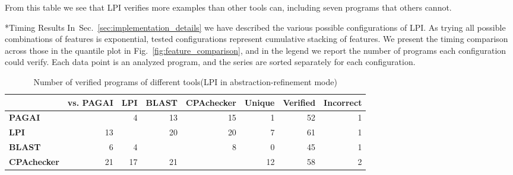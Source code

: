 \documentclass{llncs}
\makeatletter
\renewcommand{\paragraph}{\@startsection{paragraph}{4}{\z@}{0.8ex \@plus 0ex \@minus 1ex}{-1em}{\normalfont\normalsize\bfseries}}
\makeatother
\begin{document}
From this table we see that LPI verifies more examples than other tools can, including seven programs that others cannot.

\paragraph*{Timing Results}
In~Sec.~\ref{sec:implementation_details} we have described the various possible configurations of LPI.
As trying all possible combinations of features is exponential,
tested configurations represent cumulative stacking of features.
We present the timing comparison across those in the quantile plot in
Fig.~\ref{fig:feature_comparison}, and in the legend we report the number of programs each
configuration could verify.
Each data point is an analyzed
program, and the series are sorted separately for each configuration.

\begin{table}[t]
    \centering
    
\begin{tabular}{l|rrrr|rrr}
   & vs. PAGAI & LPI & BLAST & CPAchecker & Unique & \textbf{Verified} &
   \textbf{Incorrect} \\
\midrule
\textbf{PAGAI} & \cellcolor{LightGray}  & 4 & 13 & 15 & 1 & 52 & 1\\
\textbf{LPI} & 13 & \cellcolor{LightGray}  & 20 & 20 & 7 & 61 & 1\\
\textbf{BLAST} & 6 & 4 & \cellcolor{LightGray}  & 8 & 0 & 45 & 1\\
\textbf{CPAchecker} & 21 & 17 & 21 & \cellcolor{LightGray}  & 12 & 58 & 2\\


\midrule
\end{tabular}

     \caption{Number of verified programs of different tools\protect\linebreak(LPI in abstraction-refinement mode)}
    \label{tab:summary_table}
    \vspace{-5mm}
\end{table}
\end{document}
